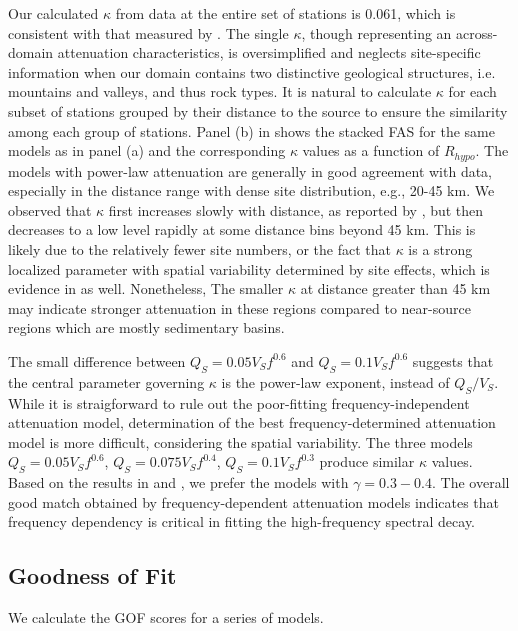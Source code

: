 Our calculated $\kappa$ from data at the entire set of stations is 0.061, which is consistent with that measured by \citet{anderson1984model}. The single $\kappa$, though representing an across-domain attenuation characteristics, is oversimplified and neglects site-specific information when our domain contains two distinctive geological structures, i.e. mountains and valleys, and thus rock types. It is natural to calculate $\kappa$ for each subset of stations grouped by their distance to the source to ensure the similarity among each group of stations. Panel (b) in  shows the stacked FAS for the same models as in panel (a) and the corresponding $\kappa$ values as a function of $R_{hypo}$. The models with power-law attenuation are generally in good agreement with data, especially in the distance range with dense site distribution, e.g., 20-45 km. We observed that $\kappa$ first increases slowly with distance, as reported by \citet{anderson1984model}, but then decreases to a low level rapidly at some distance bins beyond 45 km. This is likely due to the relatively fewer site numbers, or the fact that $\kappa$ is a strong localized parameter with spatial variability determined by site effects, which is evidence in \citet{anderson1984model} as well. Nonetheless, The smaller $\kappa$ at distance greater than 45 km may indicate stronger attenuation in these regions compared to near-source regions which are mostly sedimentary basins.

The small difference between $Q_S=0.05V_Sf^{0.6}$ and $Q_S=0.1V_Sf^{0.6}$ suggests that the central parameter governing $\kappa$ is the power-law exponent, instead of $Q_S/V_S$. While it is straigforward to rule out the poor-fitting frequency-independent attenuation model, determination of the best frequency-determined attenuation model is more difficult, considering the spatial variability. The three models $Q_S=0.05V_Sf^{0.6}$, $Q_S=0.075V_Sf^{0.4}$, $Q_S=0.1V_Sf^{0.3}$ produce similar $\kappa$ values. Based on the results in  and , we prefer the models with $\gamma=0.3-0.4$. The overall good match obtained by frequency-dependent attenuation models indicates that frequency dependency is critical in fitting the high-frequency spectral decay.


\subsection{Goodness of Fit}
We calculate the GOF scores for a series of models.

